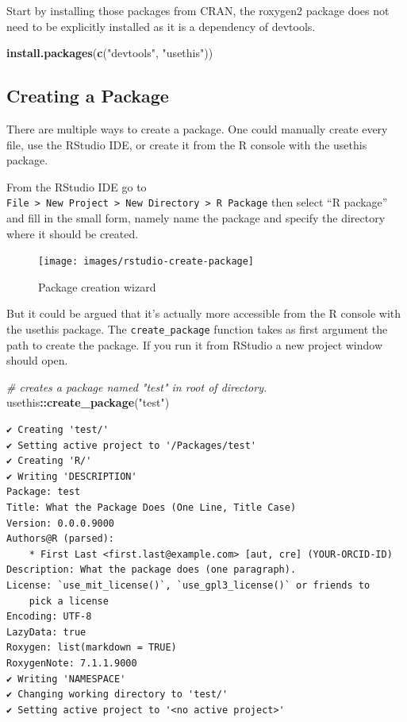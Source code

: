 \documentclass[10pt,]{krantz}
\makeatletter
\newenvironment{Shaded}{\begin{snugshade}}{\end{snugshade}}
\newcommand{\CommentTok}[1]{\textcolor[rgb]{0.37,0.37,0.37}{\textit{#1}}}
\newcommand{\KeywordTok}[1]{\textcolor[rgb]{0.27,0.27,0.27}{\textbf{#1}}}
\newcommand{\NormalTok}[1]{#1}
\newcommand{\OperatorTok}[1]{\textcolor[rgb]{0.43,0.43,0.43}{\textbf{#1}}}
\newcommand{\StringTok}[1]{\textcolor[rgb]{0.5,0.5,0.5}{#1}}
\newenvironment{kframe}{%
\medskip{}
\setlength{\fboxsep}{.8em}
 \def\at@end@of@kframe{}%
 \ifinner\ifhmode%
  \def\at@end@of@kframe{\end{minipage}}%
  \begin{minipage}{\columnwidth}%
 \fi\fi%
 \def\FrameCommand##1{\hskip\@totalleftmargin \hskip-\fboxsep
 \colorbox{shadecolor}{##1}\hskip-\fboxsep
     \hskip-\linewidth \hskip-\@totalleftmargin \hskip\columnwidth}%
 \MakeFramed {\advance\hsize-\width
   \@totalleftmargin\z@ \linewidth\hsize
   \@setminipage}}%
 {\par\unskip\endMakeFramed%
 \at@end@of@kframe}
\renewenvironment{Shaded}{\begin{kframe}}{\end{kframe}}
\makeatother
\begin{document}
Start by installing those packages from CRAN, the roxygen2 package does not need to be explicitly installed as it is a dependency of devtools.

\begin{Shaded}
\begin{Highlighting}[]
\KeywordTok{install.packages}\NormalTok{(}\KeywordTok{c}\NormalTok{(}\StringTok{"devtools"}\NormalTok{, }\StringTok{"usethis"}\NormalTok{))}
\end{Highlighting}
\end{Shaded}

\hypertarget{basics-create-pkg}{%
\subsection{Creating a Package}\label{basics-create-pkg}}

There are multiple ways to create a package. One could manually create every file, use the RStudio IDE, or create it from the R console with the usethis \citep{R-usethis} package.

From the RStudio IDE go to \texttt{File\ \textgreater{}\ New\ Project\ \textgreater{}\ New\ Directory\ \textgreater{}\ R\ Package} then select ``R package'' and fill in the small form, namely name the package and specify the directory where it should be created.

\begin{figure}[H]

{\centering \texttt{[image: images/rstudio-create-package]} 

}

\caption{Package creation wizard}\label{fig:rstudio-create-package}
\end{figure}

But it could be argued that it's actually more accessible from the R console with the usethis package. The \texttt{create\_package} function takes as first argument the path to create the package. If you run it from RStudio a new project window should open.

\begin{Shaded}
\begin{Highlighting}[]
\CommentTok{# creates a package named "test" in root of directory.}
\NormalTok{usethis}\OperatorTok{::}\KeywordTok{create_package}\NormalTok{(}\StringTok{"test"}\NormalTok{)}
\end{Highlighting}
\end{Shaded}

\begin{verbatim}
✔ Creating 'test/'
✔ Setting active project to '/Packages/test'
✔ Creating 'R/'
✔ Writing 'DESCRIPTION'
Package: test
Title: What the Package Does (One Line, Title Case)
Version: 0.0.0.9000
Authors@R (parsed):
    * First Last <first.last@example.com> [aut, cre] (YOUR-ORCID-ID)
Description: What the package does (one paragraph).
License: `use_mit_license()`, `use_gpl3_license()` or friends to
    pick a license
Encoding: UTF-8
LazyData: true
Roxygen: list(markdown = TRUE)
RoxygenNote: 7.1.1.9000
✔ Writing 'NAMESPACE'
✔ Changing working directory to 'test/'
✔ Setting active project to '<no active project>'
\end{verbatim}
\end{document}
